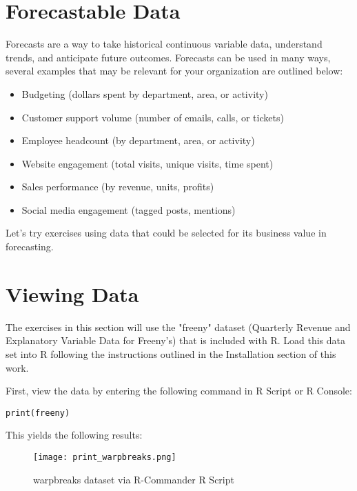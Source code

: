 %
%
%
%
%

\section{Forecastable Data}
Forecasts are a way to take historical continuous variable data, understand 
trends, and anticipate future outcomes. Forecasts can be used in many ways,
several examples that may be relevant for your organization are outlined below:

\begin{itemize}
 \item Budgeting (dollars spent by department, area, or activity)
 \item Customer support volume (number of emails, calls, or tickets)
 \item Employee headcount (by department, area, or activity)
 \item Website engagement (total visits, unique visits, time spent)
 \item Sales performance (by revenue, units, profits)
 \item Social media engagement (tagged posts, mentions)
\end{itemize}

Let's try exercises using data that could be selected for its business value 
in forecasting.

\section{Viewing Data}
The exercises in this section will use the "freeny" dataset (Quarterly Revenue and Explanatory Variable Data for Freeny's) that is included with R. Load this data set into R following the instructions outlined in the Installation section of this work.

First, view the data by entering the following command in R Script or R Console:

\texttt{print(freeny)}

This yields the following results:

\begin{figure}[h!]
\texttt{[image: print\_warpbreaks.png]}
 \caption{warpbreaks dataset via R-Commander R Script}
 \label{fig:print_warpbreaks}
\end{figure}

